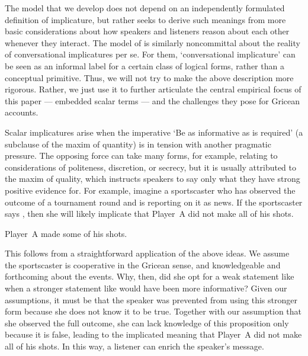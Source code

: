 \documentclass[leqno]{article}
\begin{document}
The model that we develop does not depend on an independently
formulated definition of implicature, but rather seeks to derive such
meanings from more basic considerations about how speakers and
listeners reason about each other whenever they interact. The model of
\citet{ChierchiaFoxSpector08} is similarly noncommittal about the
reality of conversational implicatures per se. For them,
`conversational implicature' can be seen as an informal label for a
certain class of logical forms, rather than a conceptual
primitive. Thus, we will not try to make the above description more
rigorous. Rather, we just use it to further articulate the central
empirical focus of this paper --- embedded scalar terms --- and the
challenges they pose for Gricean accounts.

Scalar implicatures arise when the imperative `Be as informative as is
required' (a subclause of the maxim of quantity) is in tension with
another pragmatic pressure. The opposing force can take many forms,
for example, relating to considerations of politeness, discretion, or
secrecy, but it is usually attributed to the maxim of quality, which
instructs speakers to say only what they have strong positive evidence
for. For example, imagine a sportscaster who has observed the outcome
of a tournament round and is reporting on it as news. If the
sportscaster says , then she will likely implicate that
Player~A did not make all of his shots.
%
\begin{examples}
\item\label{some} Player~A made some of his shots.
\end{examples}

This follows from a straightforward application of the above ideas. We
assume the sportscaster is cooperative in the Gricean sense, and
knowledgeable and forthcoming about the events. Why, then, did she opt
for a weak statement like  when
a stronger statement like  would
have been more informative? Given our assumptions, it must be that the
speaker was prevented from using this stronger form because she does
not know it to be true. Together with our assumption that she observed
the full outcome, she can lack knowledge of this proposition only
because it is false, leading to the implicated meaning that Player~A
did not make all of his shots. In this way, a listener can enrich the
speaker's message.
\end{document}
